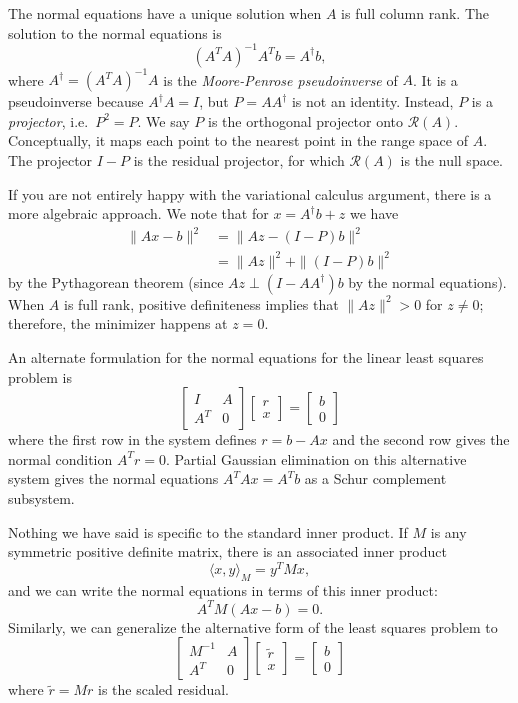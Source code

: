 \documentclass[12pt, leqno]{article} %
\begin{document}
The normal equations have a unique solution when $A$ is full column
rank.  The solution to the normal equations is
\[
  (A^T A)^{-1} A^T b = A^\dagger b,
\]
where $A^\dagger = (A^T A)^{-1} A$ is the {\em Moore-Penrose pseudoinverse}
of $A$.  It is a pseudoinverse because $A^\dagger A = I$, but
$P = A A^\dagger$ is not an identity.  Instead, $P$ is a
{\em projector}, i.e.~$P^2 = P$.  We say $P$ is the orthogonal
projector onto $\mathcal{R}(A)$.  Conceptually, it maps each point to
the nearest point in the range space of $A$.  The projector $I-P$ is
the residual projector, for which $\mathcal{R}(A)$ is the null space.

If you are not entirely happy with the variational calculus argument,
there is a more algebraic approach.  We note that for
$x = A^\dagger b + z$
we have
\begin{align*}
  \|Ax-b\|^2
  &= \|Az-(I-P)b\|^2 \\
  &= \|Az\|^2 + \|(I-P)b\|^2
\end{align*}
by the Pythagorean theorem (since $Az \perp (I-AA^\dagger) b$ by the
normal equations).  When $A$ is full rank, positive definiteness
implies that $\|Az\|^2 > 0$ for $z \neq 0$; therefore, the minimizer
happens at $z = 0$.

An alternate formulation for the normal equations for the linear least
squares problem is
\[
  \begin{bmatrix} I & A \\ A^T & 0 \end{bmatrix}
  \begin{bmatrix} r \\ x \end{bmatrix} =
  \begin{bmatrix} b \\ 0 \end{bmatrix}
\]
where the first row in the system defines $r = b-Ax$ and the second
row gives the normal condition $A^T r = 0$. Partial Gaussian
elimination on this alternative system gives the normal equations
$A^T A x = A^T b$ as a Schur complement subsystem.

Nothing we have said is specific to the standard inner product.  If
$M$ is any symmetric positive definite matrix, there is an associated
inner product
\[
  \langle x, y \rangle_M = y^T M x,
\]
and we can write the normal equations in terms of this inner product:
\[
  A^T M (Ax - b) = 0.
\]
Similarly, we can generalize the alternative form of the least squares
problem to
\[
\begin{bmatrix} M^{-1} & A \\ A^T & 0 \end{bmatrix}
\begin{bmatrix} \tilde{r} \\ x \end{bmatrix} =
\begin{bmatrix} b \\ 0 \end{bmatrix}
\]
where $\tilde{r} = M r$ is the scaled residual.
\end{document}
